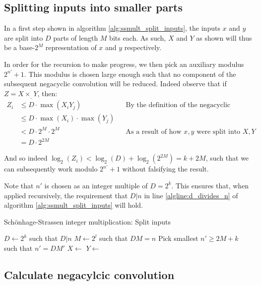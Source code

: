 \subsection{Splitting inputs into smaller parts}

In a first step shown in algorithm \ref{alg:ssmult_split_inputs}, the inputs
$x$ and $y$ are split into $D$ parts of length $M$ bits each. As such, $X$ and
$Y$ as shown will thus be a base-$2^M$ representation of $x$ and $y$
respectively.

In order for the recursion to make progress, we then pick an auxiliary modulus
$2^{n'} + 1$. This modulus is chosen large enough such that no component of the
subsequent negacyclic convolution will be reduced. Indeed observe that if $Z = X
\times_\_ Y$, then:
\begin{align*}
		Z_i & \leq D \cdot \max(X_i Y_j) && \text{By the definition of the negacyclic convolution} \\
			& \leq D \cdot \max(X_i) \cdot \max(Y_j) \\
			& < D \cdot 2^M \cdot 2^M && \text{As a result of how $x, y$ were split into $X, Y$} \\
			& = D \cdot 2^{2M}
\end{align*}

And so indeed $\log_2(Z_i) < \log_2(D) + \log_2(2^{2M}) = k + 2M$, such that we
can subsequently work modulo $2^{n'} + 1$ without falsifying the result.

Note that $n'$ is chosen as an integer multiple of $D = 2^k$. This ensures
that, when applied recursively, the requirement that $D | n$ in line
\ref{algline:d_divides_n} of algorithm \ref{alg:ssmult_split_inputs} will hold.

\begin{algorithm}
		\caption{Schönhage-Strassen integer multiplication: Split inputs}
		\begin{algorithmic}[1]
				\State $D \gets 2^k$ such that $D | n$
				\label{algline:d_divides_n}
				\State $M \gets 2^l$ such that $DM = n$
				\State Pick smallest $n' \geq 2M + k$ such that $n' = DM'$
				\State $X \gets $
				\State $Y \gets $
		\end{algorithmic}
		\label{alg:ssmult_split_inputs}
\end{algorithm}

\subsection{Calculate negacylcic convolution}

